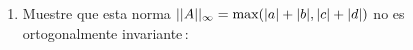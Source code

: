 \documentclass[12pt,a4paper]{article}
\newcommand\1{\mbox{\,\vrule height-0.8pt depth1.0pt width2pc\,}}
\newcommand\2{\mbox{\,\vrule height-0.8pt depth1.0pt width1pc\,}}
\begin{document}
\begin{enumerate}
\vspace{-5pt}
Encuentre una matriz de rango $1$ más cercana a $A=\left[\begin{array}{cc}3&0\\4&5\\\end{array}\right]$ que $A_1=\dfrac{3}{2}\left[\begin{array}{cc}1&1\\3&3\\\end{array}\right]$, considerando la norma infinito.
\item Muestre que esta norma $||A||_\infty=\hbox{max}(|a|+|b|, |c|+|d|)$ no es ortogonalmente invariante\,:


\end{enumerate}
\end{document}
